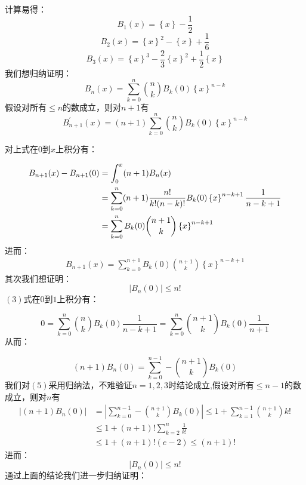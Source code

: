\documentclass[a4paper,12pt]{ctexart}
\newenvironment{prooff}{{\noindent\it\textcolor{black}{Proof}:}\quad}{\par}
\newcommand{\bbrace}[1]{\left\{ #1 \right\} }
\theoremstyle{definition}
\begin{document}
\begin{prooff}
    计算易得：$$B_1(x)=\bbrace{x} -\frac{1}{2}$$ $$ B_2(x)=\bbrace{x}^2-\bbrace{x}+\frac{1}{6}$$
    $$B_3(x)=\bbrace{x}^3-\frac{2}{3}\bbrace{x}^2+\frac{1}{2}\bbrace{x} $$
    我们想归纳证明：
    \begin{equation}
        B_n(x)=\sum_{k=0}^{n}\binom{n}{k}B_k(0)\bbrace{x}^{n-k}
    \end{equation}
    假设对所有$\le n$的数成立，则对$n+1$有
    \begin{equation*}
        B_{n+1}^{\prime}(x)=(n+1)\sum_{k=0}^{n}\binom{n}{k}B_k(0)\bbrace{x}^{n-k}
    \end{equation*}

    对上式在$0$到$x$上积分有：

    \begin{align}
        B_{n+1}(x)-B_{n+1}(0) & =\int _{0}^{x}(n+1)B_n(x)                                                             \\
                              & =\sum_{k=0}^{n}(n+1)\frac{n!}{k!(n-k)!}B_k(0)\bbrace{x}^{n-k+1}\frac{1}{n-k+1} \notag \\
                              & =\sum_{k=0}^nB_k(0)\binom{n+1}{k}\bbrace{x}^{n-k+1} \notag
    \end{align}
    进而：
    \begin{align*}
        B_{n+1}(x)=\sum_{k=0}^{n+1}B_k(0)\binom{n+1}{k}\bbrace{x}^{n-k+1}
    \end{align*}
    其次我们想证明：
    \begin{equation}
        |B_n(0)|\le n!
    \end{equation}
    $(3)$式在$0$到$1$上积分有：

    \begin{equation*}
        0=\sum_{k=0}^{n}\binom{n}{k}B_k(0)\frac{1}{n-k+1}=\sum_{k=0}^n \binom{n+1}{k}B_k(0)\frac{1}{n+1}
    \end{equation*}
    从而：

    \begin{equation*}
        (n+1)B_n(0)=\sum_{k=0}^{n-1}-\binom{n+1}{k}B_k(0)
    \end{equation*}
    我们对$(5)$采用归纳法，不难验证$n=1,2,3$时结论成立,假设对所有$\le n-1$的数成立，则对$n$有
    \begin{align*}
        |(n+1)B_n(0)| & =|\sum_{k=0}^{n-1}-\binom{n+1}{k}B_k(0)|\le 1+\sum_{k=1}^{n-1}\binom{n+1}{k}k! \\
                      & \le 1+(n+1)!\sum_{k=2}^{n}\frac{1}{k!}                                         \\
                      & \le 1+(n+1)!(e-2)\le (n+1)!
    \end{align*}
    进而：
    \begin{equation*}
        |B_n(0)|\le n!
    \end{equation*}
    通过上面的结论我们进一步归纳证明：


\end{prooff}
\end{document}

